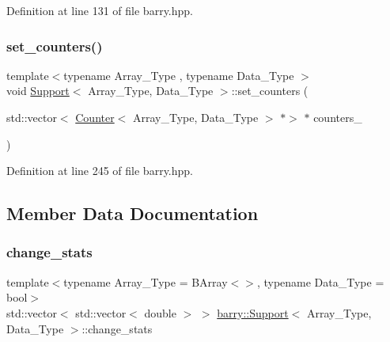 Definition at line 131 of file barry.\+hpp.

\mbox{\label{classbarry_1_1_support_a07f225ee54158980ededaccc47abad4c}} 
\subsubsection{\texorpdfstring{set\+\_\+counters()}{set\_counters()}}
{\footnotesize\ttfamily template$<$typename Array\+\_\+\+Type , typename Data\+\_\+\+Type $>$ \\
void \hyperlink{classbarry_1_1_support}{Support}$<$ Array\+\_\+\+Type, Data\+\_\+\+Type $>$\+::set\+\_\+counters (\begin{DoxyParamCaption}\item[{std\+::vector$<$ \hyperlink{classbarry_1_1_counter}{Counter}$<$ Array\+\_\+\+Type, Data\+\_\+\+Type $>$ $\ast$$>$ $\ast$}]{counters\+\_\+ }\end{DoxyParamCaption})\hspace{0.3cm}{\ttfamily [inline]}}



Definition at line 245 of file barry.\+hpp.



\subsection{Member Data Documentation}
\mbox{\label{classbarry_1_1_support_a09cebbb8953514f77e2f70d447d3ff2a}} 
\subsubsection{\texorpdfstring{change\+\_\+stats}{change\_stats}}
{\footnotesize\ttfamily template$<$typename Array\+\_\+\+Type  = B\+Array$<$$>$, typename Data\+\_\+\+Type  = bool$>$ \\
std\+::vector$<$ std\+::vector$<$ double $>$ $>$ \hyperlink{classbarry_1_1_support}{barry\+::\+Support}$<$ Array\+\_\+\+Type, Data\+\_\+\+Type $>$\+::change\+\_\+stats}



